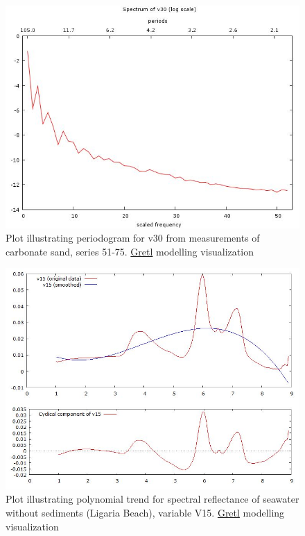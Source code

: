 \documentclass[10pt, a4paper]{article}
\begin{document}
\begin{appendices}
\begin{figure}[H]
	\begin{center}
		\includegraphics[scale=0.25]{G-period-sand30.jpg}
		\caption{Plot illustrating periodogram for v30 from measurements of carbonate sand, series 51-75. \href{http://gretl.sourceforge.net/}{Gretl} modelling visualization­}\label{fig:A.31}
	\end{center}	
\end{figure}
\pagebreak

\begin{figure}[H]
	\begin{center}
		\includegraphics[scale=0.32]{G-polynom-trend-wo.jpg}
		\caption{Plot illustrating polynomial trend for spectral reflectance of seawater without sediments (Ligaria Beach), variable V15. \href{http://gretl.sourceforge.net/}{Gretl} modelling visualization­}
	\end{center}
	\label{fig:A.32}
\end{figure}


\end{appendices}
\end{document}
